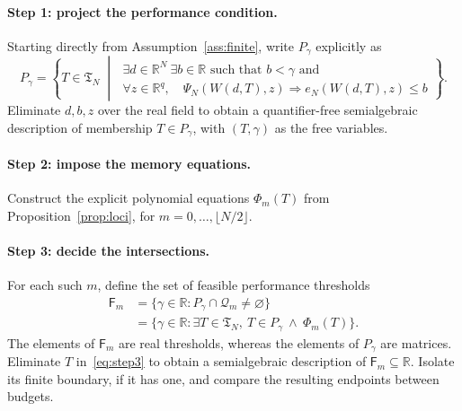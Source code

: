 \documentclass[11pt]{article}
\numberwithin{equation}{section}
\theoremstyle{definition}
\newcommand{\R}{\mathbb R}
\newcommand{\Q}{\mathcal Q}
\begin{document}
\paragraph{Step 1: project the performance condition.}
Starting directly from Assumption~\ref{ass:finite}, write $P_\gamma$ explicitly as
\begin{equation}
 P_\gamma=\left\{T\in\mathfrak T_N\;\middle|\;
 \begin{array}{l}
 \exists d\in\R^N\ \exists b\in\R\text{ such that }b<\gamma\text{ and}\\[2pt]
 \forall z\in\R^q,\quad
 \Psi_N(W(d,T),z)\Rightarrow e_N(W(d,T),z)\le b
 \end{array}
 \right\}.
 \label{eq:step1}
\end{equation}
Eliminate $d,b,z$ over the real field to obtain a quantifier-free semialgebraic description of membership $T\in P_\gamma$, with $(T,\gamma)$ as the free variables.

\paragraph{Step 2: impose the memory equations.}
Construct the explicit polynomial equations $\Phi_m(T)$ from Proposition~\ref{prop:loci}, for $m=0,\ldots,\lfloor N/2\rfloor$.

\paragraph{Step 3: decide the intersections.}
For each such $m$, define the set of feasible performance thresholds
\begin{equation}
 \begin{aligned}
 \mathsf F_m&=\{\gamma\in\R:P_\gamma\cap\Q_m\ne\varnothing\}\\
 &=\{\gamma\in\R:\exists T\in\mathfrak T_N,\ T\in P_\gamma\ \land\ \Phi_m(T)\}.
 \end{aligned}
 \label{eq:step3}
\end{equation}
The elements of $\mathsf F_m$ are real thresholds, whereas the elements of $P_\gamma$ are matrices. Eliminate $T$ in~\eqref{eq:step3} to obtain a semialgebraic description of $\mathsf F_m\subseteq\R$. Isolate its finite boundary, if it has one, and compare the resulting endpoints between budgets.
\end{document}

